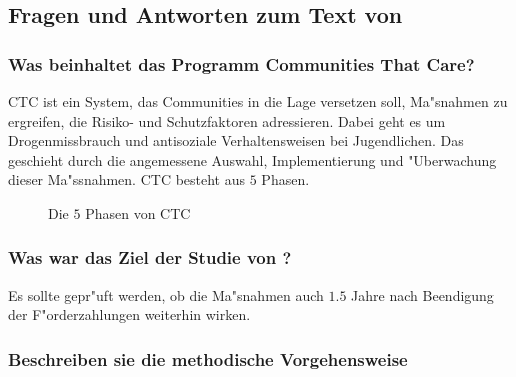 \subsection{Fragen und Antworten zum Text von \textcite{rhew_sustained_2013}}
\subsubsection{Was beinhaltet das Programm Communities That Care?}


CTC ist ein System, das Communities in die Lage versetzen soll, Ma"snahmen zu ergreifen, die Risiko- und Schutzfaktoren adressieren. Dabei geht es um Drogenmissbrauch und antisoziale Verhaltensweisen bei Jugendlichen. Das geschieht durch die angemessene Auswahl, Implementierung und "Uberwachung dieser Ma"ssnahmen. CTC besteht aus $5$ Phasen.

\begin{figure}[<+htpb+>]
        \begin{center}
        \end{center}
        \caption{Die $5$ Phasen von CTC}
        \label{fig:fuenfphasen}
\end{figure}

\subsubsection{Was war das Ziel der Studie von \textcite{rhew_sustained_2013}?}

Es sollte gepr"uft werden, ob die Ma"snahmen auch $1.5$ Jahre nach Beendigung der F"orderzahlungen weiterhin wirken.

\subsubsection{Beschreiben sie die methodische Vorgehensweise}

